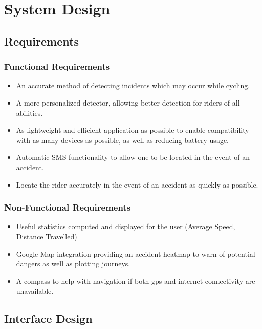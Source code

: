 \chapter{System Design}



\section{Requirements}


\subsection{Functional Requirements}
\begin{itemize}
\item An accurate method of detecting incidents which may occur while cycling.
\item A more personalized detector, allowing better detection for riders of all abilities. 
\item As lightweight and efficient application as possible to enable compatibility with as many devices as possible, as well as reducing battery usage. 
\item Automatic SMS functionality to allow one to be located in the event of an accident.
\item Locate the rider accurately in the event of an accident as quickly as possible. 
\end{itemize}


\subsection{Non-Functional Requirements}
\begin{itemize}
\item Useful statistics computed and displayed for the user (Average Speed, Distance Travelled)
\item Google Map integration providing an accident heatmap to warn of potential dangers as well as plotting journeys.
\item A compass to help with navigation if both gps and internet connectivity are unavailable.
\end{itemize}


\newpage


\section{Interface Design}


